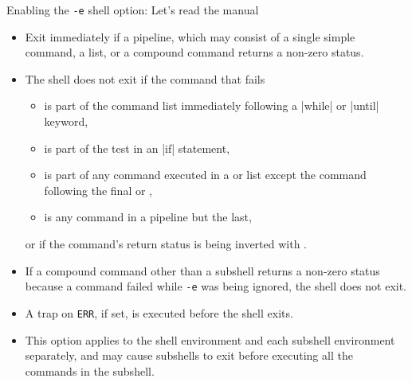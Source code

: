 \begin{frame}{Enabling the \;\texttt{-e}\; shell option: Let's read the manual}
    \vspace{-3mm}
    \begin{itemize}[<1>]
        \item Exit immediately if a pipeline, which may consist of a single simple command, a list, or a compound command returns a non-zero status.
        \item The shell does not exit if the command that fails
              \begin{itemize}
                  \item is part of the command list immediately following a \bash|while| or \bash|until| keyword,
                  \item is part of the test in an \bash|if| statement,
                  \item is part of any command executed in a \PB{\texttt{\&\&}} or \PB{\texttt{||}} list except the command following the final \PB{\texttt{\&\&}} or \PB{\texttt{||}},
                  \item is any command in a pipeline but the last,
              \end{itemize}
              or if the command’s return status is being inverted with \PB{\texttt{!}}.
        \item If a compound command other than a subshell returns a non-zero status because a command failed while \texttt{-e} was being ignored, the shell does not exit.
        \item A trap on \texttt{ERR}, if set, is executed before the shell exits.
        \item This option applies to the shell environment and each subshell environment separately, and may cause subshells to exit before executing all the commands in the subshell.
    \end{itemize}
\end{frame}

